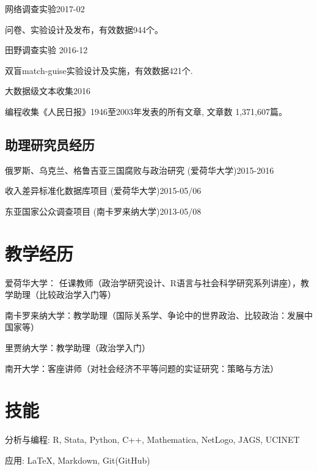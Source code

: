 \documentclass[10.5pt,]{article}
\providecommand{\tightlist}{%
	\setlength{\itemsep}{0pt}\setlength{\parskip}{0pt}}
\renewenvironment{itemize}{
	\begin{list}{}{
			\setlength{\leftmargin}{1.5em}
		}
	}{
	\end{list}
}
\begin{document}
\begin{itemize}
\tightlist
\item
  网络调查实验\hfill 2017-02

  \begin{itemize}
  \tightlist
  \item
    \footnotesize 问卷、实验设计及发布，有效数据944个。
  \end{itemize}
\item
  田野调查实验 \hfill 2016-12

  \begin{itemize}
  \tightlist
  \item
    \footnotesize 双盲match-guise实验设计及实施，有效数据421个.
  \end{itemize}
\item
  大数据级文本收集\hfill 2016

  \begin{itemize}
  \tightlist
  \item
    \footnotesize 编程收集《人民日报》1946至2003年发表的所有文章, 文章数
    1,371,607篇。
  \end{itemize}
\end{itemize}

\subsection{助理研究员经历}

\begin{itemize}
\tightlist
\item
  俄罗斯、乌克兰、格鲁吉亚三国腐败与政治研究
  (爱荷华大学)\hfill 2015-2016
\item
  收入差异标准化数据库项目 (爱荷华大学)\hfill 2015-05/06
\item
  东亚国家公众调查项目 (南卡罗来纳大学)\hfill 2013-05/08
\end{itemize}

\section{教学经历}

\begin{itemize}
\tightlist
\item
  爱荷华大学：
  任课教师（政治学研究设计、R语言与社会科学研究系列讲座），教学助理（比较政治学入门等）
\item
  南卡罗来纳大学：教学助理（国际关系学、争论中的世界政治、比较政治：发展中国家等）
\item
  里贾纳大学：教学助理（政治学入门）
\item
  南开大学：客座讲师（对社会经济不平等问题的实证研究：策略与方法）
\end{itemize}

\section{技能}

\begin{itemize}
\tightlist
\item
  分析与编程: R, Stata, Python, C++, Mathematica, NetLogo, JAGS, UCINET
\item
  应用: \LaTeX, Markdown, Git(GitHub)
\end{itemize}
	
			
\end{document}
